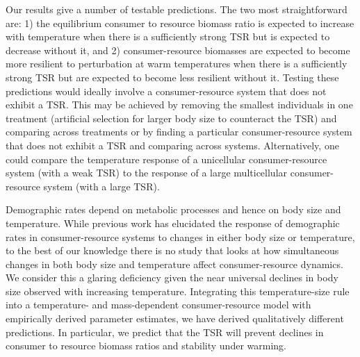 \documentclass[11pt]{article}
\begin{document}
%


Our results give a number of testable predictions.
The two most straightforward are: 
1) the equilibrium consumer to resource biomass ratio is expected to increase with temperature when there is a sufficiently strong TSR but is expected to decrease without it, and %
2) consumer-resource biomasses are expected to become more resilient to perturbation at warm temperatures when there is a sufficiently strong TSR but are expected to become less resilient without it.
Testing these predictions would ideally involve a consumer-resource system that does not exhibit a TSR. 
This may be achieved by removing the smallest individuals in one treatment (artificial selection for larger body size to counteract the TSR) and comparing across treatments or by finding a particular consumer-resource system that does not exhibit a TSR and comparing across systems.
Alternatively, one could compare the temperature response of a unicellular consumer-resource system (with a weak TSR) to the response of a large multicellular consumer-resource system (with a large TSR).


Demographic rates depend on metabolic processes and hence on body size and temperature.
While previous work has elucidated the response of demographic rates in consumer-resource systems to changes in either body size or temperature, to the best of our knowledge there is no study that looks at how simultaneous changes in both body size and temperature affect consumer-resource dynamics.
We consider this a glaring deficiency given the near universal declines in body size observed with increasing temperature.
Integrating this temperature-size rule into a temperature- and mass-dependent consumer-resource model with empirically derived parameter estimates, we have derived qualitatively different predictions.
In particular, we predict that the TSR will prevent declines in consumer to resource biomass ratios and stability under warming. 
\end{document}

